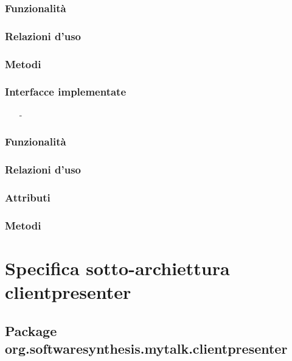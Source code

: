 
\subsubsection*{Funzionalità}

\subsubsection*{Relazioni d'uso}

\subsubsection*{Metodi}


\subsubsection*{Interfacce implementate}
\begin{itemize}[noitemsep,nolistsep]
  \item[-] 
\end{itemize}

\subsubsection*{Funzionalità}

\subsubsection*{Relazioni d'uso}

\subsubsection*{Attributi}

\subsubsection*{Metodi}

\clearpage

\section{Specifica sotto-archiettura clientpresenter}\label{clientpresenterarchitecture}

\subsection{Package org.softwaresynthesis.mytalk.clientpresenter}\label{sec:clientpresetner}


